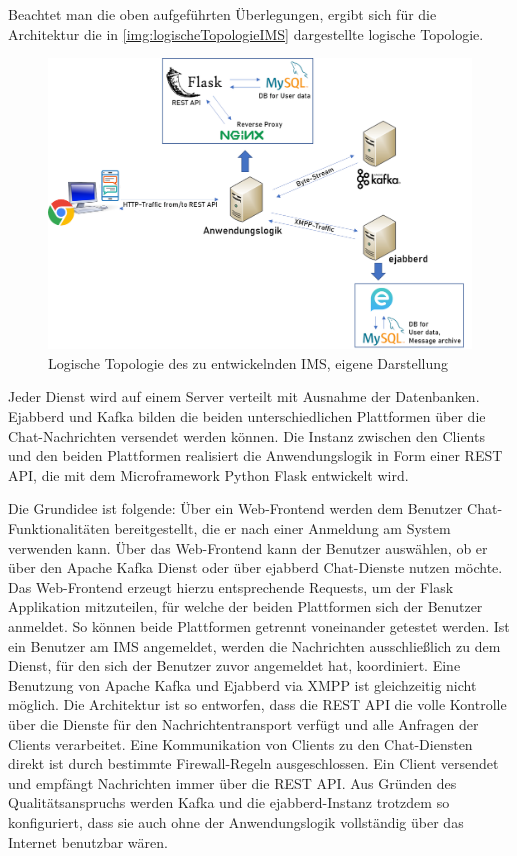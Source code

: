 \documentclass[a4paper,titlepage,halfparskip,12pt]{scrreprt}
\begin{document}
\begin{onehalfspacing}
Beachtet man die oben aufgeführten Überlegungen, ergibt sich für die Architektur die in \autoref{img:logischeTopologieIMS} dargestellte logische Topologie.

\begin{figure}[h]
	\centering
	\includegraphics[width=\linewidth]{images/DetailliertesIMSArchitecture}
	\caption{Logische Topologie des zu entwickelnden \ac{IMS}, eigene Darstellung}
	\label{img:logischeTopologieIMS}
\end{figure}


Jeder Dienst wird auf einem Server verteilt mit Ausnahme der Datenbanken. Ejabberd und Kafka bilden die beiden unterschiedlichen Plattformen über die Chat-Nachrichten versendet werden können. Die Instanz zwischen den Clients und den beiden Plattformen realisiert die Anwendungslogik in Form einer \acs{REST} \acs{API}, die mit dem Microframework Python Flask entwickelt wird.

Die Grundidee ist folgende: Über ein Web-Frontend werden dem Benutzer Chat-Funktionalitäten bereitgestellt, die er nach einer Anmeldung am System verwenden kann. Über das Web-Frontend kann der Benutzer auswählen, ob er über den Apache Kafka Dienst oder über ejabberd Chat-Dienste nutzen möchte. Das Web-Frontend erzeugt hierzu entsprechende Requests, um der Flask Applikation mitzuteilen, für welche der beiden Plattformen sich der Benutzer anmeldet. So können beide Plattformen getrennt voneinander getestet werden. Ist ein Benutzer am \ac{IMS} angemeldet, werden die Nachrichten ausschließlich zu dem Dienst, für den sich der Benutzer zuvor angemeldet hat, koordiniert. Eine Benutzung von Apache Kafka und Ejabberd via \ac{XMPP} ist gleichzeitig nicht möglich. Die Architektur ist so entworfen, dass die \acs{REST} \acs{API} die volle Kontrolle über die Dienste für den Nachrichtentransport verfügt und alle Anfragen der Clients verarbeitet. Eine Kommunikation von Clients zu den Chat-Diensten direkt ist durch bestimmte Firewall-Regeln ausgeschlossen. Ein Client versendet und empfängt Nachrichten immer über die \acs{REST} \acs{API}. Aus Gründen des Qualitätsanspruchs werden Kafka und die ejabberd-Instanz trotzdem so konfiguriert, dass sie auch ohne der Anwendungslogik vollständig über das Internet benutzbar wären.


\end{onehalfspacing}
\end{document}
